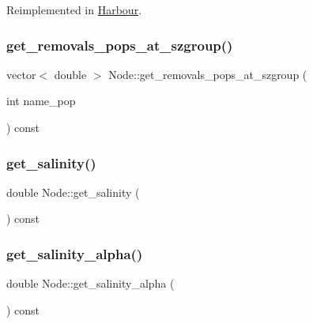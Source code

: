 Reimplemented in \mbox{\hyperlink{class_harbour_a2eec3ef3caca2336f7d0579fd2ba6d73}{Harbour}}.

\mbox{\label{class_node_a77efffa3c257251bd58293cd24a180c2}} 
\subsubsection{\texorpdfstring{get\_removals\_pops\_at\_szgroup()}{get\_removals\_pops\_at\_szgroup()}}
{\footnotesize\ttfamily vector$<$ double $>$ Node\+::get\+\_\+removals\+\_\+pops\+\_\+at\+\_\+szgroup (\begin{DoxyParamCaption}\item[{int}]{name\+\_\+pop }\end{DoxyParamCaption}) const}

\mbox{\label{class_node_aef951d924fccfa00d85fb6266958b7d9}} 
\subsubsection{\texorpdfstring{get\_salinity()}{get\_salinity()}}
{\footnotesize\ttfamily double Node\+::get\+\_\+salinity (\begin{DoxyParamCaption}{ }\end{DoxyParamCaption}) const}

\mbox{\label{class_node_acf70e42469453174491104645e5b93e3}} 
\subsubsection{\texorpdfstring{get\_salinity\_alpha()}{get\_salinity\_alpha()}}
{\footnotesize\ttfamily double Node\+::get\+\_\+salinity\+\_\+alpha (\begin{DoxyParamCaption}{ }\end{DoxyParamCaption}) const}

\mbox{\label{class_node_aba57d21b5bc8a9347b14dafcf870d104}} 
